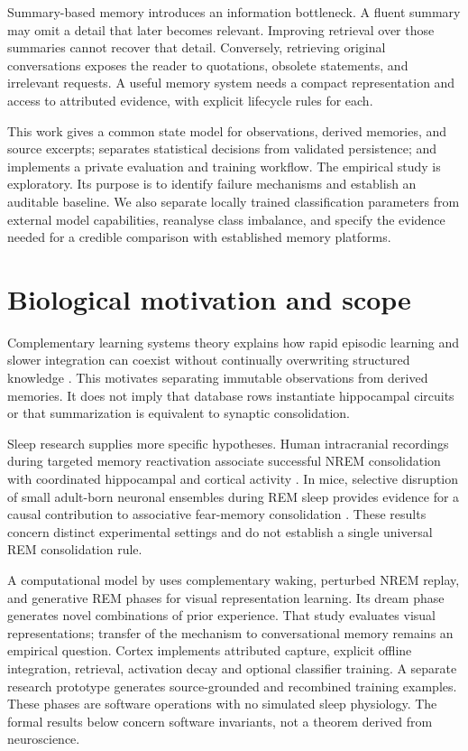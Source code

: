 \documentclass[11pt]{article}
\begin{document}
Summary-based memory introduces an information bottleneck. A fluent summary may omit a detail that later becomes relevant. Improving retrieval over those summaries cannot recover that detail. Conversely, retrieving original conversations exposes the reader to quotations, obsolete statements, and irrelevant requests. A useful memory system needs a compact representation and access to attributed evidence, with explicit lifecycle rules for each.

This work gives a common state model for observations, derived memories, and source excerpts; separates statistical decisions from validated persistence; and implements a private evaluation and training workflow. The empirical study is exploratory. Its purpose is to identify failure mechanisms and establish an auditable baseline. We also separate locally trained classification parameters from external model capabilities, reanalyse class imbalance, and specify the evidence needed for a credible comparison with established memory platforms.

\section{Biological motivation and scope}
Complementary learning systems theory explains how rapid episodic learning and slower integration can coexist without continually overwriting structured knowledge \citep{cls}. This motivates separating immutable observations from derived memories. It does not imply that database rows instantiate hippocampal circuits or that summarization is equivalent to synaptic consolidation.

Sleep research supplies more specific hypotheses. Human intracranial recordings during targeted memory reactivation associate successful NREM consolidation with coordinated hippocampal and cortical activity \citep{nrem2025}. In mice, selective disruption of small adult-born neuronal ensembles during REM sleep provides evidence for a causal contribution to associative fear-memory consolidation \citep{rem2025}. These results concern distinct experimental settings and do not establish a single universal REM consolidation rule.

A computational model by \citet{dreaming} uses complementary waking, perturbed NREM replay, and generative REM phases for visual representation learning. Its dream phase generates novel combinations of prior experience. That study evaluates visual representations; transfer of the mechanism to conversational memory remains an empirical question. Cortex implements attributed capture, explicit offline integration, retrieval, activation decay and optional classifier training. A separate research prototype generates source-grounded and recombined training examples. These phases are software operations with no simulated sleep physiology. The formal results below concern software invariants, not a theorem derived from neuroscience.
\end{document}
